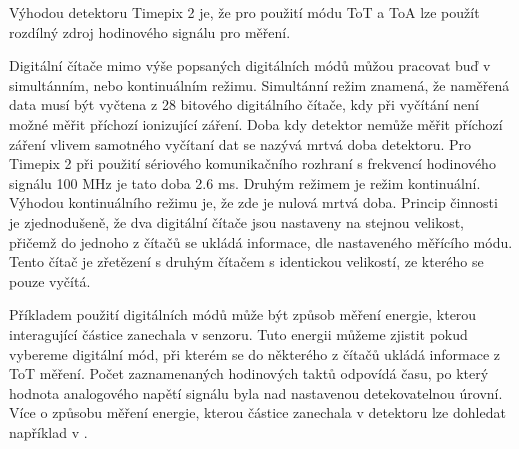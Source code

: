 \par Výhodou detektoru Timepix 2 je, že pro použití módu ToT a ToA lze použít rozdílný zdroj hodinového signálu pro měření.

\par Digitální čítače mimo výše popsaných digitálních módů můžou pracovat buď v simultánním, nebo kontinuálním režimu. Simultánní režim znamená, že naměřená data musí být vyčtena z 28 bitového digitálního čítače, kdy při vyčítání není možné měřit příchozí ionizující záření. Doba kdy detektor nemůže měřit příchozí záření vlivem samotného vyčítaní dat se nazývá mrtvá doba detektoru. Pro Timepix 2 při použití sériového komunikačního rozhraní s frekvencí hodinového signálu 100 MHz je tato doba 2.6 ms. Druhým režimem je režim kontinuální. Výhodou kontinuálního režimu je, že zde je nulová mrtvá doba. Princip činnosti je zjednodušeně, že dva digitální čítače jsou nastaveny na stejnou velikost, přičemž do jednoho z čítačů se ukládá informace, dle nastaveného měřícího módu. Tento čítač je zřetězení s druhým čítačem s identickou velikostí, ze kterého se pouze vyčítá. 

\par Příkladem použití digitálních módů může být způsob měření energie, kterou interagující částice zanechala v senzoru. Tuto energii můžeme zjistit pokud vybereme digitální mód, při kterém se do některého z čítačů ukládá informace z ToT měření. Počet zaznamenaných hodinových taktů odpovídá času, po který hodnota analogového napětí signálu byla nad nastavenou detekovatelnou úrovní. Více o způsobu měření energie, kterou částice zanechala v detektoru lze dohledat například v \cite{JAKUBEK2011S262}.


